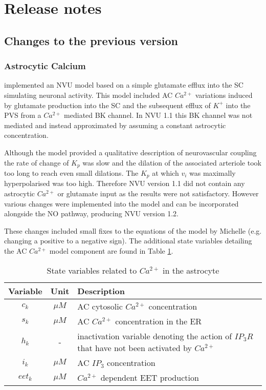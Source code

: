 \section{Release notes}

\subsection{Changes to the previous version}

	\subsubsection{Astrocytic Calcium}
	
	\citet{Farr2011} implemented an NVU model based on a simple glutamate efflux into the SC simulating neuronal activity. This model included AC $Ca^{2+}$ variations induced by glutamate production into the SC and the subsequent efflux of $K^+$ into the PVS from a $Ca^{2+}$ mediated BK channel. In NVU 1.1 this BK channel was not \ca mediated and instead approximated by assuming a constant astrocytic \ca concentration.
			
	Although the model provided a qualitative description of neurovascular coupling the rate of change of $K_p$ was slow and the dilation of the associated arteriole took too long to reach even small dilations. The $K_p$ at which $v_i$ was maximally hyperpolarised was too high. 
	Therefore NVU version 1.1 did not contain any astrocytic $Ca^{2+}$ or glutamate input as the results were not satisfactory. 
	However various changes were implemented into the model and can be incorporated alongside the NO pathway, producing NVU version 1.2. 
	
	These changes included small fixes to the equations of the model by Michelle (e.g. changing a positive to a negative sign). 
	The additional state variables detailing the AC $Ca^{2+}$ model component are found in Table \ref{tab:NVU12ac}.
	
			\begin{table}[h!]
				\small
				\centering
					\begin{tabular}{c c l}
				\hline
				Variable & Unit & Description \\
				\hline
				$c_k$ & $\mu M$ & AC cytosolic $Ca^{2+}$ concentration \\
				$s_k$ & $\mu M$ & AC $Ca^{2+}$ concentration in the ER \\
				$h_k$ & - & inactivation variable denoting the action of $IP_3R$ that have not been activated by $Ca^{2+}$ \\
				$i_k$ & $\mu M$ & AC $IP_3$ concentration \\
				$eet_k$ &  $\mu M$ & $Ca^{2+}$ dependent EET production \\
				\hline
					\end{tabular}
					\caption{State variables related to $Ca^{2+}$ in the astrocyte}
					\label{tab:NVU12ac}
			\end{table}
			
